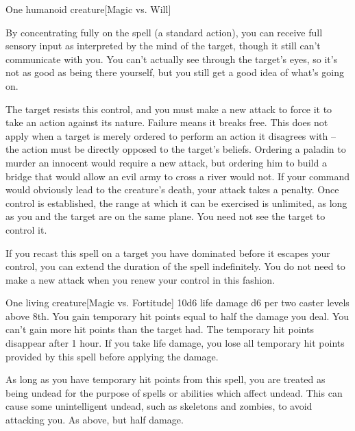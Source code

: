 \begin{spelltarget}{One humanoid creature}[Magic vs. Will]
    \par By concentrating fully on the spell (a standard action), you can receive full sensory input as interpreted by the mind of the target, though it still can't communicate with you. You can't actually see through the target's eyes, so it's not as good as being there yourself, but you still get a good idea of what's going on.
    \par The target resists this control, and you must make a new attack to force it to take an action against its nature. Failure means it breaks free. This does not apply when a target is merely ordered to perform an action it disagrees with -- the action must be directly opposed to the target's beliefs. Ordering a paladin to murder an innocent would require a new attack, but ordering him to build a bridge that would allow an evil army to cross a river would not. If your command would obviously lead to the creature's death, your attack takes a  penalty. Once control is established, the range at which it can be exercised is unlimited, as long as you and the target are on the same plane. You need not see the target to control it.
    \par If you recast this spell on a target you have dominated before it escapes your control, you can extend the duration of the spell indefinitely. You do not need to make a new attack when you renew your control in this fashion.
\end{spelltarget}

\spellrng{\rngclose}
\spelldur{\durlong}
\begin{spelltarget}{One living creature}[Magic vs. Fortitude]
    \spellsuccess 10d6 life damage \add d6 per two caster levels above 8th. You gain temporary hit points equal to half the damage you deal. You can't gain more hit points than the target had. The temporary hit points disappear after 1 hour. If you take life damage, you lose all temporary hit points provided by this spell before applying the damage.

    As long as you have temporary hit points from this spell, you are treated as being undead for the purpose of spells or abilities which affect undead. This can cause some unintelligent undead, such as skeletons and zombies, to avoid attacking you.
    \spellfailure As above, but half damage.
\end{spelltarget}

\begin{comment}
\subsubsection{E}
\end{comment}

